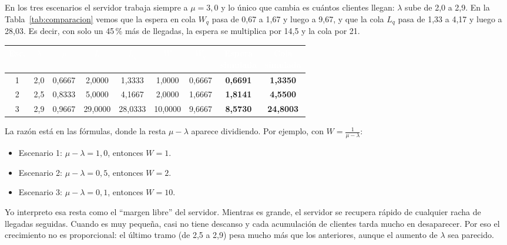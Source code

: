 \documentclass[11pt,a4paper]{article}
\renewcommand{\arraystretch}{1.08}
\begin{document}
En los tres escenarios el servidor trabaja siempre a $\mu = 3{,}0$ y lo único que cambia es cuántos clientes llegan: $\lambda$ sube de 2,0 a 2,9. En la Tabla~\ref{tab:comparacion} vemos que la espera en cola $W_q$ pasa de 0,67 a 1,67 y luego a 9,67, y que la cola $L_q$ pasa de 1,33 a 4,17 y luego a 28,03. Es decir, con solo un 45\,\% más de llegadas, la espera se multiplica por 14,5 y la cola por 21.

\begin{table}[h!]
\centering
\setlength{\arrayrulewidth}{0.75pt}
\renewcommand{\arraystretch}{1.3}
\small
\begin{tabular}{|c|c|c|c|c|c|c|c|c|}
\hline
\rowcolor{headerblue}
\textbf{\textcolor{white}{Esc.}} &
\textbf{\textcolor{white}{$\lambda$}} &
\textbf{\textcolor{white}{$\rho$}} &
\textbf{\textcolor{white}{$L$}} &
\textbf{\textcolor{white}{$L_q$}} &
\textbf{\textcolor{white}{$W$}} &
\textbf{\textcolor{white}{$W_q$}} &
\makecell{\textbf{\textcolor{white}{Espera}} \\ \textbf{\textcolor{white}{simulada}}} &
\makecell{\textbf{\textcolor{white}{Cola}} \\ \textbf{\textcolor{white}{simulada}}} \\ \hline
1 & 2{,}0 & 0{,}6667 & 2{,}0000 & 1{,}3333 & 1{,}0000 & 0{,}6667 & \textbf{0{,}6691} & \textbf{1{,}3350} \\ \hline
\rowcolor{rowlight}
2 & 2{,}5 & 0{,}8333 & 5{,}0000 & 4{,}1667 & 2{,}0000 & 1{,}6667 & \textbf{1{,}8141} & \textbf{4{,}5500} \\ \hline
3 & 2{,}9 & 0{,}9667 & 29{,}0000 & 28{,}0333 & 10{,}0000 & 9{,}6667 & \textbf{8{,}5730} & \textbf{24{,}8003} \\ \hline
\end{tabular}

\end{table}

La razón está en las fórmulas, donde la resta $\mu-\lambda$ aparece dividiendo. Por ejemplo, con $W = \frac{1}{\mu-\lambda}$:

\begin{itemize}
    \item Escenario 1: $\mu-\lambda = 1{,}0$, entonces $W = 1$.
    \item Escenario 2: $\mu-\lambda = 0{,}5$, entonces $W = 2$.
    \item Escenario 3: $\mu-\lambda = 0{,}1$, entonces $W = 10$.
\end{itemize}

Yo interpreto esa resta como el ``margen libre'' del servidor. Mientras es grande, el servidor se recupera rápido de cualquier racha de llegadas seguidas. Cuando es muy pequeña, casi no tiene descanso y cada acumulación de clientes tarda mucho en desaparecer. Por eso el crecimiento no es proporcional: el último tramo (de 2,5 a 2,9) pesa mucho más que los anteriores, aunque el aumento de $\lambda$ sea parecido.
\end{document}
